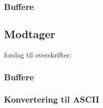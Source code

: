 \subsubsection{Buffere}



\subsection{Modtager}

forslag til overskrifter:
\subsubsection{Buffere}
\subsubsection{Konvertering til ASCII}